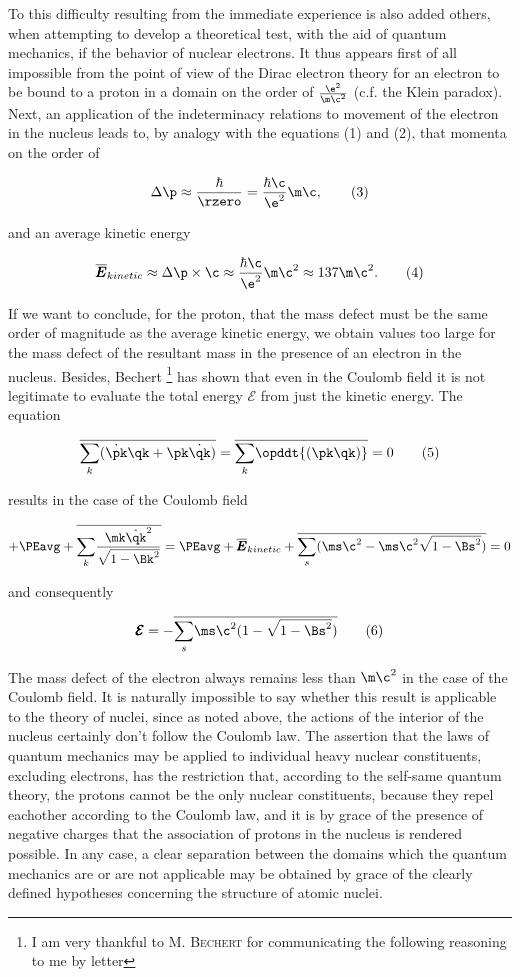 \documentclass{article}
\newcommand{\var}[1]{\pmb{#1}}
\newcommand{\ddt}[1]{\dot{#1}}
\newcommand{\E}{\var{E}}
\newcommand{\Etotal}{\pmb{\mathcal{E}}}
\newcommand{\avg}[1]{\overline{#1}}
\newcommand{\KEavg}{{\avg{\E}_{kinetic}}}
\newcommand{\ser}[2]{\underset{#1}{\sum} #2 }
\newcommand{\valrzero}{\frac{\e^2}{\m\c^2}}
\newcommand{\nequ}[2]{
\begin{equation*}
#1
\tag{#2}
\end{equation*}
}
\newcommand{\uequ}[1]{
\begin{equation*}
#1
\end{equation*}
}
\begin{document}
To this difficulty resulting from the immediate experience is also added others, when attempting to develop a theoretical test, with the aid of quantum mechanics, if the behavior of nuclear electrons. It thus appears first of all impossible from the point of view of the Dirac electron theory for an electron to be bound to a proton in a domain on the order of $\valrzero$ (c.f. the Klein paradox). Next, an application of the indeterminacy relations to movement of the electron in the nucleus leads to, by analogy with the equations (1) and (2), that momenta on the order of

\nequ{
\Delta\p \approx \frac{\hbar}{\rzero} = \frac{\hbar\c}{\e^2}\m\c,
}{3} 

and an average kinetic energy

\nequ{
\KEavg \approx \Delta\p \times \c \approx \frac{\hbar\c}{\e^2}\m\c^2 \approx 137 \m\c^2.
}{4}

If we want to conclude, for the proton, that the mass defect must be the same order of magnitude as the average kinetic energy, we obtain values too large for the mass defect of the resultant mass in the presence of an electron in the nucleus. Besides, Bechert \footnote{I am very thankful to \textsc{M. Bechert} for communicating the following reasoning to me by letter} has shown that even in the Coulomb field it is not legitimate to evaluate the total energy $\Etotal$ from just the kinetic energy. The equation

\nequ{
\overline{
  \ser{k}{(\ddt{\pk}\qk + \pk\ddt{\qk})}
} = \overline{
  \ser{k}{\opddt{(\pk\qk)}}
} = 0
}{5}

results in the case of the Coulomb field

\uequ{
+ \PEavg + 
\overline{
  \ser{k}{
    \frac{\mk\ddt{\qk}^2}{\sqrt{1-\Bk^2}}
  }
} = \PEavg + \KEavg + 
\overline{
  \ser{s}{
      (\ms\c^2 - \ms\c^2\sqrt{1-\Bs^2})
  }
} = 0
}

and consequently

\nequ{
\Etotal = - \overline{\ser{s}{\ms\c^2(1-\sqrt{1-\Bs^2})}}
}{6}

The mass defect of the electron always remains less than $\m\c^2$ in the case of the Coulomb field. It is naturally impossible to say whether this result is applicable to the theory of nuclei, since as noted above, the actions of the interior of the nucleus certainly don't follow the Coulomb law.
The assertion that the laws of quantum mechanics may be applied to individual heavy nuclear constituents, excluding electrons, has the restriction that, according to the self-same quantum theory, the protons cannot be the only nuclear constituents, because they repel eachother according to the Coulomb law, and it is by grace of the presence of negative charges that the association of protons in the nucleus is rendered possible.  In any case, a clear separation between the domains which the quantum mechanics are or are not applicable may be obtained by grace of the clearly defined hypotheses concerning the structure of atomic nuclei.
\end{document}
